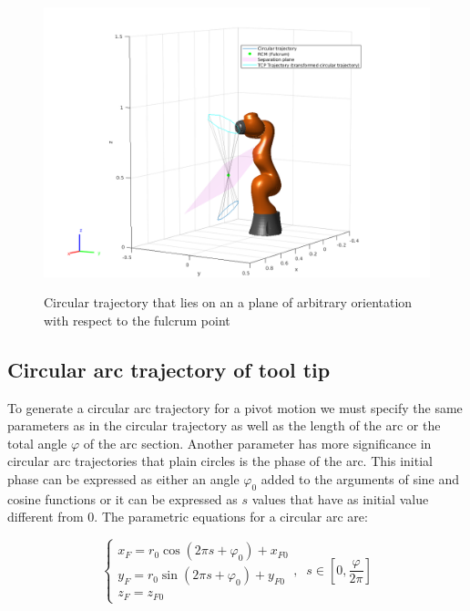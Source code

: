 \begin{center}
\begin{figure}[htbp]
\centering
\includegraphics[width=\textwidth]{images/rcm_trajectories/robot-pose-random-rcm-circle-traj.png}\\
\caption{Circular trajectory that lies on an a plane of arbitrary orientation with respect to the fulcrum point}
\end{figure}
\end{center}


\subsection{Circular arc trajectory of tool tip}

To generate a circular arc trajectory for a pivot motion we must specify the same parameters as 
in the circular trajectory as well as the length of the arc or the total angle $φ$ of the arc 
section. Another parameter has more significance in circular arc trajectories that plain circles is the phase of the arc. This initial phase can be expressed as either an angle $φ_0$ added to the arguments of 
sine and cosine functions or it can be expressed as $s$ values that have as initial value different from $0$. The parametric equations for a circular arc are:

\begin{equation}
\begin{cases}
x^{}_{F} = r_0\cos(2πs + φ_0) + x^{}_{F0} \\
y^{}_{F} = r_0\sin(2πs + φ_0) + y^{}_{F0} \\
z^{}_{F} = z^{}_{F0}
\end{cases} ,
\;\;
s \in \left[ 0, \frac{φ}{2π} \right]
\end{equation}

